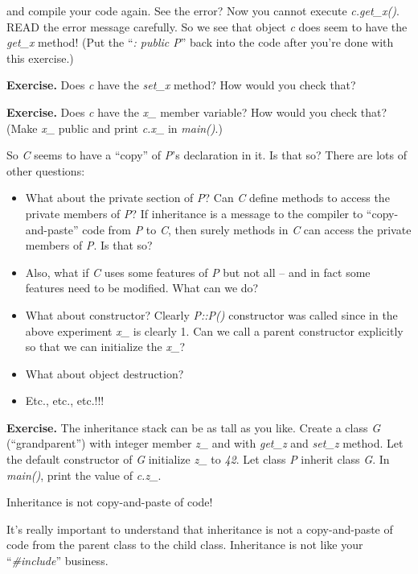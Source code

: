 \documentclass[
]{article}
\providecommand{\tightlist}{%
  \setlength{\itemsep}{0pt}\setlength{\parskip}{0pt}}
\begin{document}
and compile your code again. See the error? Now you cannot execute
\emph{c.get\_x()}. READ the error message carefully. So we see that
object \emph{c} does seem to have the \emph{get\_x} method! (Put the
``\emph{: public P}'' back into the code after you're done with this
exercise.)

\textbf{Exercise.} Does \emph{c} have the \emph{set\_x} method? How
would you check that?

\textbf{Exercise.} Does \emph{c} have the \emph{x\_} member variable?
How would you check that? (Make \emph{x\_} public and print \emph{c.x\_}
in \emph{main()}.)

So \emph{C} seems to have a ``copy'' of \emph{P}'s declaration in it. Is
that so? There are lots of other questions:

\begin{itemize}
\tightlist
\item
  What about the private section of \emph{P}? Can \emph{C} define
  methods to access the private members of \emph{P}? If inheritance is a
  message to the compiler to ``copy-and-paste'' code from \emph{P }to
  \emph{C}, then surely methods in \emph{C }can access the private
  members of \emph{P}. Is that so?
\item
  Also, what if \emph{C} uses some features of \emph{P} but not all --
  and in fact some features need to be modified. What can we do?
\item
  What about constructor? Clearly \emph{P::P()} constructor was called
  since in the above experiment \emph{x\_ }is clearly 1. Can we call a
  parent constructor explicitly so that we can initialize the
  \emph{x\_}?
\item
  What about object destruction?
\item
  Etc., etc., etc.!!!
\end{itemize}

\textbf{Exercise.} The inheritance stack can be as tall as you like.
Create a class \emph{G} (``grandparent'') with integer member \emph{z\_}
and with \emph{get\_z} and \emph{set\_z} method. Let the default
constructor of \emph{G} initialize \emph{z\_} to \emph{42}. Let class
\emph{P} inherit class \emph{G}. In \emph{main()}, print the value of
\emph{c.z\_}.

Inheritance is not copy-and-paste of code!

It's really important to understand that inheritance is not a
copy-and-paste of code from the parent class to the child class.
Inheritance is not like your ``\emph{\#include}'' business.
\end{document}
